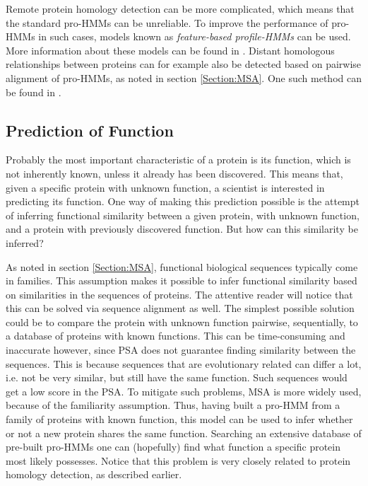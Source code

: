 \documentclass{article}\usepackage[]{graphicx}\usepackage[]{color}
\begin{document}
Remote protein homology detection can be more complicated, which means that the standard pro-HMMs can be unreliable. To improve the performance of pro-HMMs in such cases, models known as \textit{feature-based profile-HMMs} can be used. More information about these models can be found in \cite{Yoon2009}. Distant homologous relationships between proteins can for example also be detected based on pairwise alignment of pro-HMMs, as noted in section \ref{Section:MSA}. One such method can be found in \cite{Soding2005}.

\subsection{Prediction of Function}\label{Section:ProtPredFunc}
Probably the most important characteristic of a protein is its function, which is not inherently known, unless it already has been discovered. This means that, given a specific protein with unknown function, a scientist is interested in predicting its function. One way of making this prediction possible is the attempt of inferring functional similarity between a given protein, with unknown function, and a protein with previously discovered function. But how can this similarity be inferred? 

As noted in section \ref{Section:MSA}, functional biological sequences typically come in families. This assumption makes it possible to infer functional similarity based on similarities in the sequences of proteins. The attentive reader will notice that this can be solved via sequence alignment as well. The simplest possible solution could be to compare the protein with unknown function pairwise, sequentially, to a database of proteins with known functions. This can be time-consuming and inaccurate however, since PSA does not guarantee finding similarity between the sequences. This is because sequences that are evolutionary related can differ a lot, i.e. not be very similar, but still have the same function. Such sequences would get a low score in the PSA. To mitigate such problems, MSA is more widely used, because of the familiarity assumption. Thus, having built a pro-HMM from a family of proteins with known function, this model can be used to infer whether or not a new protein shares the same function. Searching an extensive database of pre-built pro-HMMs one can (hopefully) find what function a specific protein most likely possesses. Notice that this problem is very closely related to protein homology detection, as described earlier. 
\end{document}

